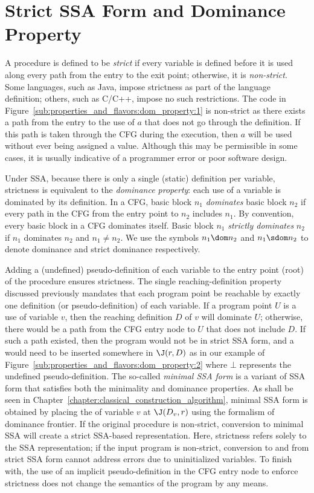\section{Strict SSA Form and Dominance Property}
\label{sec:properties_and_flavours:domprop}
A procedure is defined to be \emph{strict} if every variable is defined before it is used along every path from the entry to the exit point; 
otherwise, it is \emph{non-strict}. 
Some languages, such as Java, impose strictness as part of the language definition; 
others, such as C/C++, impose no such restrictions. 
The code in Figure~\ref{sub:properties_and_flavors:dom_property:1} is non-strict as there exists a path from the entry to the use of $a$ that does not go through the definition. 
If this path is taken through the CFG during the execution, then $a$ will be used without ever being assigned a value. 
Although this may be permissible in some cases, it is usually indicative of a programmer error or poor software design.

Under SSA, because there is only a single (static) definition per variable, strictness is equivalent to the \emph{dominance property}: 
each use of a variable is dominated by its definition. 
In a CFG, basic block $n_{1}$ \emph{dominates} basic block $n_{2}$ if every path in the CFG from the entry point to $n_{2}$ includes $n_{1}$. 
By convention, every basic block in a CFG dominates itself. 
Basic block $n_{1}$ \emph{strictly dominates} $n_{2}$ if $n_{1}$ dominates $n_{2}$ and $n_{1} \neq n_{2}$. 
We use the symbols $n_{1} \dom n_{2}$ and $n_{1} \sdom n_{2}$ to denote dominance and strict dominance respectively.


Adding a (undefined) pseudo-definition of each variable to the entry point (root) of the procedure ensures strictness. 
The single reaching-definition property discussed previously mandates that each program point be reachable by exactly one definition (or pseudo-definition) of each variable. 
If a program point $U$ is a use of variable $v$, then the reaching definition $D$ of $v$ will dominate $U$; 
otherwise, there would be a path from the CFG entry node to $U$ that does not include $D$. 
If such a path existed, then the program would not be in strict SSA form, and a \phifun would need to be inserted somewhere in $\J(r,D)$ as in our example of Figure~\ref{sub:properties_and_flavors:dom_property:2} where $\bot$ represents the undefined pseudo-definition. 
The so-called \emph{minimal SSA form} is a variant of SSA form that satisfies both the minimality and dominance properties. 
As shall be seen in Chapter~\ref{chapter:classical_construction_algorithm}, minimal SSA form is obtained by placing the \phifuns of variable $v$ at $\J(D_v,r)$ using the formalism of dominance frontier. 
If the original procedure is non-strict, conversion to minimal SSA will create a strict SSA-based representation. 
Here, strictness refers solely to the SSA representation; 
if the input program is non-strict, conversion to and from strict SSA form cannot address errors due to uninitialized variables. 
To finish with, the use of an implicit pseudo-definition in the CFG entry node to enforce strictness does not change the semantics of the program by any means.


